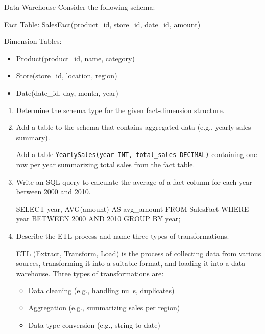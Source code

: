 \documentclass{article}
\begin{document}
\begin{exercise}{Data Warehouse}
  Consider the following schema:

  Fact Table: SalesFact(product\_id, store\_id, date\_id, amount)

  Dimension Tables:
    \begin{itemize}
      \item Product(product\_id, name, category)
      \item Store(store\_id, location, region)
      \item Date(date\_id, day, month, year)
    \end{itemize}

  \begin{enumerate}
    \item Determine the schema type for the given fact-dimension structure. 

    \item Add a table to the schema that contains aggregated data (e.g., yearly sales summary). \begin{solution}
        Add a table \texttt{YearlySales(year INT, total\_sales DECIMAL)} containing one row per year summarizing total sales from the fact table.
      \end{solution}

    \item Write an SQL query to calculate the average of a fact column for each year between 2000 and 2010. \begin{solution}
          SELECT year, AVG(amount) AS avg\_amount FROM SalesFact WHERE year BETWEEN 2000 AND 2010 GROUP BY year;
      \end{solution}

    \item Describe the ETL process and name three types of transformations. \begin{solution}
        ETL (Extract, Transform, Load) is the process of collecting data from various sources, transforming it into a suitable format, and loading it into a data warehouse.
        Three types of transformations are:
        \begin{itemize}
          \item Data cleaning (e.g., handling nulls, duplicates)
          \item Aggregation (e.g., summarizing sales per region)
          \item Data type conversion (e.g., string to date)
        \end{itemize}
      \end{solution}


\end{enumerate}
\end{exercise}
\end{document}
